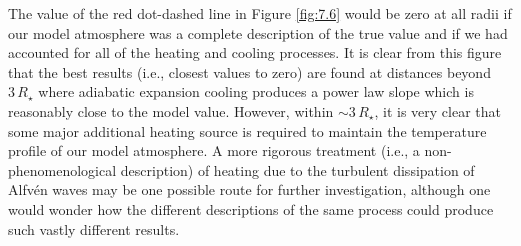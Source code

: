 The value of the red dot-dashed line in Figure \ref{fig:7.6} would be zero at all radii if our model atmosphere was a complete description of the true value and if we had accounted for all of the heating and cooling processes. It is clear from this figure that the best results (i.e., closest values to zero) are found at distances beyond  $3\,R_{\star}$ where adiabatic expansion cooling produces a power law slope which is reasonably close to the model value. However, within $\sim 3\,R_{\star}$, it is very clear that some major additional heating source is required to maintain the temperature profile of our model atmosphere. A more rigorous treatment (i.e., a non-phenomenological description) of heating due to the turbulent dissipation of Alfv\'en waves may be one possible route for further investigation, although one would wonder how the different descriptions of the same process could produce such vastly different results. 